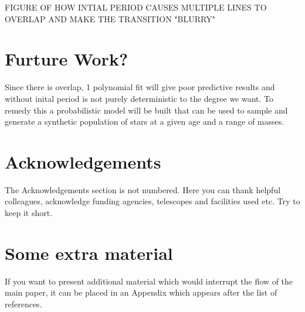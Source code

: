 \documentclass[fleqn,usenatbib]{mnras}
\begin{document}
FIGURE OF HOW INTIAL PERIOD CAUSES MULTIPLE LINES TO OVERLAP AND MAKE THE TRANSITION "BLURRY"



\section{Furture Work?}
Since there is overlap, 1 polynomial fit will give poor predictive results and without inital period is not purely deterministic to the degree we want.
To remedy this a probabilistic model will be built that can be used to sample and generate a synthetic population of stars at a given age and a range of masses.

\section*{Acknowledgements}

The Acknowledgements section is not numbered. Here you can thank helpful
colleagues, acknowledge funding agencies, telescopes and facilities used etc.
Try to keep it short.










\appendix

\section{Some extra material}

If you want to present additional material which would interrupt the flow of the main paper,
it can be placed in an Appendix which appears after the list of references.



\bsp	%
\label{lastpage}
\end{document}
